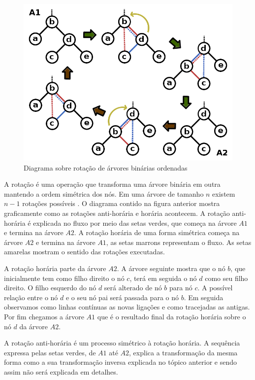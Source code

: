 \begin{figure}[H]
	\caption{\label{gram_cls}Diagrama sobre rotação de árvores binárias ordenadas}
	\begin{center}
	    \includegraphics[scale=0.4]{tree_rotations.png}
	\end{center}
\end{figure}

A rotação é uma operação que transforma uma árvore binária em outra mantendo a ordem simétrica dos nós. Em uma árvore de tamanho $n$ existem $n-1$ rotações possíveis \cite{binTree}. O diagrama contido na figura anterior mostra graficamente como as rotações anti-horária e horária acontecem. A rotação anti-horária é explicada no fluxo por meio das setas verdes, que começa na árvore $A1$ e termina na árvore $A2$. A rotação horária de uma forma simétrica começa na árvore $A2$ e termina na árvore $A1$, as setas marrons representam o fluxo. As setas amarelas mostram o sentido das rotações executadas.

A rotação horária parte da árvore $A2$. A árvore seguinte mostra que o nó $b$, que inicialmente tem como filho direito o nó $c$, terá em seguida o nó $d$ como seu filho direito. O filho esquerdo do nó $d$ será alterado de nó $b$ para nó $c$. A possível relação entre o nó $d$ e o seu nó pai será passada para o nó $b$. Em seguida observamos como linhas contínuas as novas ligações e como tracejadas as antigas. Por fim chegamos a árvore $A1$ que é o resultado final da rotação horária sobre o nó $d$ da árvore $A2$.

A rotação anti-horária é um processo simétrico à rotação horária. A sequência expressa pelas setas verdes, de $A1$ até $A2$, explica a transformação da mesma forma como a sua transformação inversa explicada no tópico anterior e sendo assim não será explicada em detalhes.

